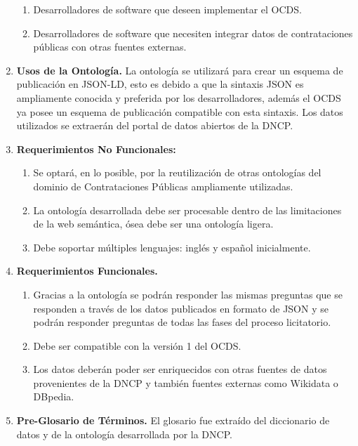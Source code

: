 \begin{enumerate}
\begin{enumerate}
    \item Desarrolladores de software que deseen implementar el OCDS.
    \item Desarrolladores de software que necesiten integrar datos de contrataciones públicas con otras fuentes externas. \end{enumerate}
\item \textbf{Usos de la Ontología. }La ontología se utilizará para crear un esquema de publicación en JSON-LD, esto es debido a que la sintaxis JSON es ampliamente conocida y preferida por los desarrolladores, además el OCDS ya posee un esquema de publicación compatible con esta sintaxis. Los datos utilizados se extraerán del portal de datos abiertos de la DNCP.
\item \textbf{Requerimientos No Funcionales: }
\begin{enumerate}
    \item Se optará, en lo posible, por la reutilización de otras ontologías del dominio de Contrataciones Públicas ampliamente utilizadas.
    \item La ontología desarrollada debe ser procesable dentro de las limitaciones de la web semántica, ósea debe ser una ontología ligera.
    \item Debe soportar múltiples lenguajes: inglés y español inicialmente.
\end{enumerate}
\item \textbf{Requerimientos Funcionales. }
    \begin{enumerate}
        \item Gracias a la ontología se podrán responder las mismas preguntas que se responden a través de los datos publicados en formato de JSON y se podrán responder preguntas de todas las fases del proceso licitatorio.
        \item Debe ser compatible con la versión 1 del OCDS.
        \item Los datos deberán poder ser enriquecidos con otras fuentes de datos provenientes de la DNCP y también fuentes externas como Wikidata o DBpedia.
    \end{enumerate}
\item \textbf{Pre-Glosario de Términos.} El glosario fue extraído del diccionario de datos y de la ontología desarrollada por la DNCP. 
\end{enumerate}

